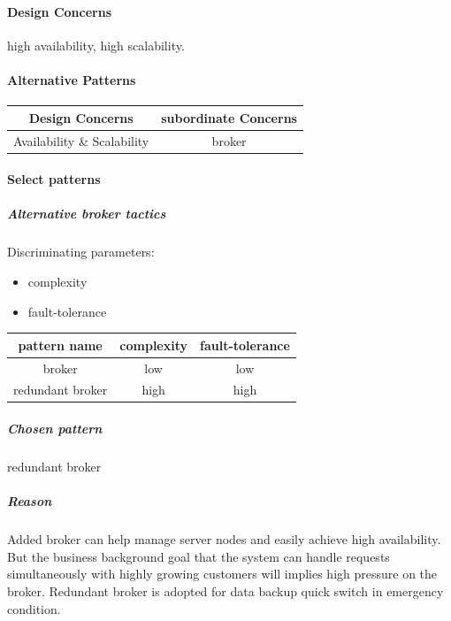 \documentclass{article}
\begin{document}
			\paragraph{Design Concerns} high availability, high scalability.
			\paragraph{Alternative Patterns}
			\begin{center}
				\begin{tabular}{|c|c|}
					\hline
					Design Concerns & subordinate Concerns\\
					\hline 
					Availability \& Scalability & broker\\
					\hline
				\end{tabular}
			\end{center}
			\paragraph{Select patterns}
			\subparagraph{Alternative broker tactics}
			Discriminating parameters:\\
			\begin{itemize}
				\item complexity
				\item fault-tolerance
			\end{itemize}
			\begin{center}
				\begin{tabular}{|c|c|c|}
					\hline
					pattern name & complexity & fault-tolerance\\
					\hline
					broker& low& low\\
					\hline
					redundant broker& high& high\\
					\hline
				\end{tabular}
			\end{center}
			\subparagraph{Chosen pattern} 
			redundant broker
			\subparagraph{Reason} 
			Added broker can help manage server nodes and easily achieve high availability. But the business background goal that the system can handle requests simultaneously with highly growing customers will implies high pressure on the broker. Redundant broker is adopted for data backup quick switch in emergency condition. 
\end{document}
